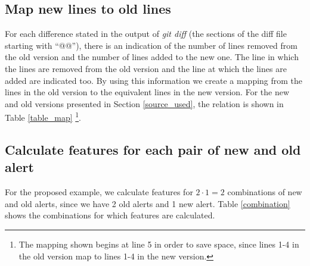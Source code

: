 \documentclass[
]{article}
\begin{document}
\normalsize

\subsection{Map new lines to old lines}\label{map}

For each difference stated in the output of \textit{git diff} (the
sections of the diff file starting with ``@@''), there is an indication
of the number of lines removed from the old version and the number of
lines added to the new one. The line in which the lines are removed from
the old version and the line at which the lines are added are indicated
too. By using this information we create a mapping from the lines in the
old version to the equivalent lines in the new version. For the new and
old versions presented in Section \ref{source_used}, the relation is
shown in Table \ref{table_map}
\footnote{The mapping shown begins at line 5 in order to save space, since lines 1-4 in the old version map to lines 1-4 in the new version.}.

\small

\begin{table}[H]

\caption{\label{tab:showing map }Relation between lines of the old version and lines of the new version\label{table_map}}
\centering
{}
\end{table}

\normalsize

\subsection{Calculate features for each pair of new and old alert}

For the proposed example, we calculate features for \(2 \cdot 1 = 2\)
combinations of new and old alerts, since we have 2 old alerts and 1 new
alert. Table \ref{combination} shows the combinations for which features
are calculated.
\end{document}
